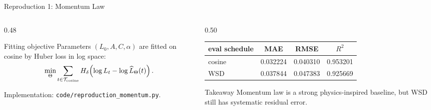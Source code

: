 \documentclass[fontset=fandol,aspectratio=169,10pt]{ctexbeamer}
\newcommand{\smallnote}[1]{{\scriptsize\color{tdltGray}#1}}
\begin{document}
\begin{frame}{Reproduction 1: Momentum Law}
  \begin{columns}[T,onlytextwidth]
    \begin{column}{0.48\textwidth}
      \begin{block}{Fitting objective}
        Parameters \((L_0,A,C,\alpha)\) are fitted on cosine by Huber loss in log space:
        \[
          \min_\Theta \sum_{t\in\mathcal T_{\rm cosine}}
          H_\delta\!\left(\log L_t-\log \widehat L_\Theta(t)\right).
        \]
      \end{block}
      \smallnote{Implementation: \texttt{code/reproduction\_momentum.py}.}
    \end{column}
    \begin{column}{0.50\textwidth}
      \begin{table}
        \centering
        \scriptsize
        \begin{tabular}{lccc}
          \toprule
          eval schedule & MAE & RMSE & \(R^2\)\\
          \midrule
          cosine & 0.032224 & 0.040310 & 0.953201\\
          WSD & 0.037844 & 0.047383 & 0.925669\\
          \bottomrule
        \end{tabular}
      \end{table}
      \begin{block}{Takeaway}
        Momentum law is a strong physics-inspired baseline, but WSD still has systematic residual error.
      \end{block}
    \end{column}
  \end{columns}
\end{frame}
\end{document}
